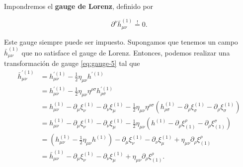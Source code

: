 \documentclass[letterpaper,11pt]{article}
\begin{document}
Impondremos el \textbf{gauge de Lorenz}, definido por
\begin{shaded}
\begin{equation}
\partial^{\nu} \bar{h}_{\mu\nu}^{(1)} \stackrel{!}{=} 0. \label{eq:Gauge-Lorenz}
\end{equation}
\end{shaded}

Este gauge siempre puede ser impuesto. Supongamos que tenemos un campo $\bar{h}_{\mu\nu}^{(1)}$ que no satisface el gauge de Lorenz. Entonces, podemos realizar una transformación de gauge \eqref{eq:gauge-5} tal que 
\begin{align}
\bar{h}_{\mu\nu}^{'(1)} &= h_{\mu\nu}^{'(1)} - \frac{1}{2}\eta_{\mu\nu} h^{'(1)} \nonumber \\
&= h_{\mu\nu}^{'(1)} - \frac{1}{2}\eta_{\mu\nu} \eta^{\rho\sigma} h_{\rho\sigma}^{'(1)} \nonumber\\
&= h_{\mu\nu}^{(1)} - \partial_{\mu} \xi_{\nu}^{(1)} - \partial_{\nu} \xi_{\mu}^{(1)} - \frac{1}{2}\eta_{\mu\nu} \eta^{\rho\sigma} \left(h_{\rho\sigma}^{(1)} - \partial_{\rho} \xi_{\sigma}^{(1)} - \partial_{\rho} \xi_{\sigma}^{(1)} \right) \nonumber \\
&= h_{\mu\nu}^{(1)} - \partial_{\mu} \xi_{\nu}^{(1)} - \partial_{\nu} \xi_{\mu}^{(1)} - \frac{1}{2}\eta_{\mu\nu} \left(h^{(1)} - \partial_{\rho} \xi^{\rho}_{(1)} - \partial_{\rho} \xi^{\sigma}_{(1)} \right) \nonumber \\
&= \left( h_{\mu\nu}^{(1)} - \frac{1}{2}\eta_{\mu\nu}h^{(1)} \right) - \partial_{\mu} \xi_{\nu}^{(1)} - \partial_{\nu} \xi_{\mu}^{(1)} + \eta_{\mu\nu} \partial_{\rho} \xi^{\rho}_{(1)} \nonumber \\
&= \bar{h}_{\mu\nu}^{(1)}  - \partial_{\mu} \xi_{\nu}^{(1)} - \partial_{\nu} \xi_{\mu}^{(1)} + \eta_{\mu\nu} \partial_{\rho} \xi^{\rho}_{(1)}.
\end{align}
\end{document}
